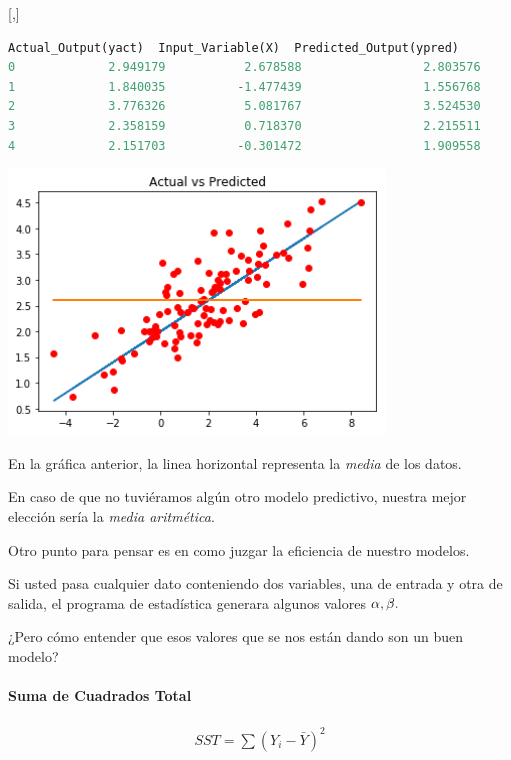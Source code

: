 [,]{} \tiny
\begin{lstlisting}[language=Python]
   Actual_Output(yact)  Input_Variable(X)  Predicted_Output(ypred)
0             2.949179           2.678588                 2.803576
1             1.840035          -1.477439                 1.556768
2             3.776326           5.081767                 3.524530
3             2.358159           0.718370                 2.215511
4             2.151703          -0.301472                 1.909558
\end{lstlisting}


\begin{center}
 \includegraphics[width=10cm,keepaspectratio=true]{./images/actualVsPredicted.png}
\end{center}



En la gráfica anterior, la linea horizontal representa la \emph{media} de los datos.


En caso de que no tuviéramos algún otro modelo predictivo, nuestra mejor elección sería la \emph{media aritmética}.


Otro punto para pensar es en como juzgar la eficiencia de nuestro modelos. 

Si usted pasa cualquier dato conteniendo dos variables, una de entrada y otra de salida, el programa de estadística generara algunos valores $\alpha,\beta.$



¿Pero cómo entender que esos valores que se nos están dando son un buen modelo?

\paragraph{Suma de Cuadrados Total}
\begin{align}
 SST = \sum\left( Y_{i}-\bar{Y} \right)^{2}
\end{align}

